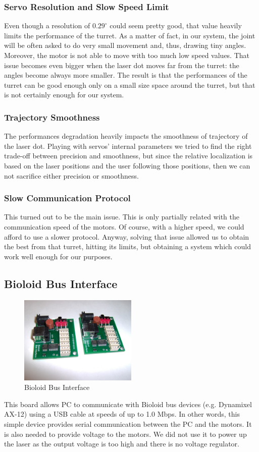 \subsubsection{Servo Resolution and Slow Speed Limit}
Even though a resolution of $0.29^{\circ}$ could seem pretty good, that value heavily limits the performance of the turret. As a matter of fact, in our system, the joint will be often asked to do very small movement and, thus, drawing tiny angles. Moreover, the motor is not able to move with too much low speed values. That issue becomes even bigger when the laser dot moves far from the turret: the angles become always more smaller. The result is that the performances of the turret can be good enough only on a small size space around the turret, but that is not certainly enough for our system.
\subsubsection{Trajectory Smoothness}
The performances degradation heavily impacts the smoothness of trajectory of the laser dot. Playing with servos' internal parameters we tried to find the right trade-off between precision and smoothness, but since the relative localization is based on the laser positions and the user following those positions, then we can not sacrifice either precision or smoothness.
\subsubsection{Slow Communication Protocol}
This turned out to be the main issue. This is only partially related with the communication speed of the motors. Of course, with a higher speed, we could afford to use a slower protocol. Anyway, solving that issue allowed us to obtain the best from that turret, hitting its limits, but obtaining a system which could work well enough for our purposes.

\subsection{Bioloid Bus Interface}
\begin{figure}
	\centering
	\includegraphics[width=0.5\textwidth]{img/busInterface.jpg}%
	\caption{Bioloid Bus Interface}
	\label{fig:busInterface}
\end{figure}
This board allows PC to communicate with Bioloid bus devices (e.g. Dynamixel AX-12) using a USB cable at speeds of up to 1.0 Mbps. In other words,
this simple device provides serial communication between the PC and the motors. It is also needed to provide voltage to the motors. We did not use it to power up the laser as the output voltage is too high and there is no voltage regulator.
